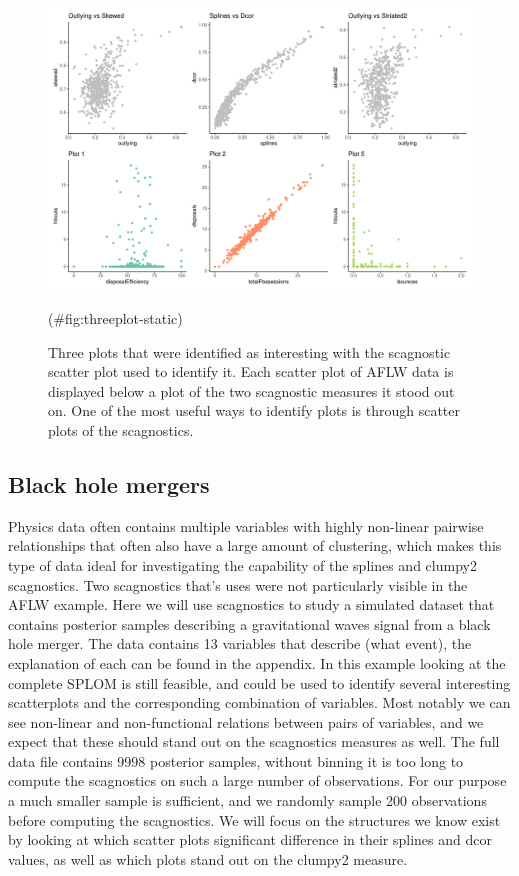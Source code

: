 \begin{Schunk}
\begin{figure}

{\centering \includegraphics[width=0.8\linewidth]{mason-lee-laa-cook_files/figure-latex/threeplot-static-1} 

}

\caption[Three plots that were identified as interesting with the scagnostic scatter plot used to identify it]{Three plots that were identified as interesting with the scagnostic scatter plot used to identify it. Each scatter plot of AFLW data is displayed below a plot of the two scagnostic measures it stood out on. One of the most useful ways to identify plots is through scatter plots of the scagnostics.}(\#fig:threeplot-static)
\end{figure}
\end{Schunk}

\hypertarget{black-hole-mergers}{%
\subsection{Black hole mergers}\label{black-hole-mergers}}

Physics data often contains multiple variables with highly non-linear
pairwise relationships that often also have a large amount of
clustering, which makes this type of data ideal for investigating the
capability of the splines and clumpy2 scagnostics. Two scagnostics
that's uses were not particularly visible in the AFLW example. Here we
will use scagnostics to study a simulated dataset that contains
posterior samples describing a gravitational waves signal from a black
hole merger. The data contains 13 variables that describe (what event),
the explanation of each can be found in the appendix. In this example
looking at the complete SPLOM is still feasible, and could be used to
identify several interesting scatterplots and the corresponding
combination of variables. Most notably we can see non-linear and
non-functional relations between pairs of variables, and we expect that
these should stand out on the scagnostics measures as well. The full
data file contains 9998 posterior samples, without binning it is too
long to compute the scagnostics on such a large number of observations.
For our purpose a much smaller sample is sufficient, and we randomly
sample 200 observations before computing the scagnostics. We will focus
on the structures we know exist by looking at which scatter plots
significant difference in their splines and dcor values, as well as
which plots stand out on the clumpy2 measure.

